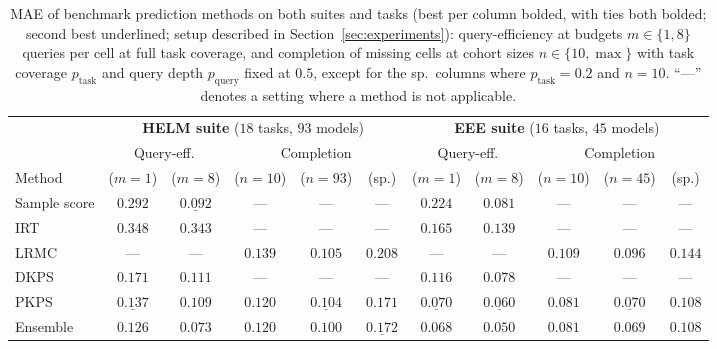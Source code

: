 \documentclass{article}
\theoremstyle{definition}
\theoremstyle{plain}
\newcommand{\PKPS}{PKPS\xspace}
\begin{document}
\begin{table}[t!]
\centering
\caption{MAE of benchmark prediction methods on both suites and tasks (best per column
bolded, with ties both bolded; second best underlined; setup described in
Section~\ref{sec:experiments}):
query-efficiency at budgets $m\in\{1,8\}$ queries per cell at full task coverage, and
completion of missing cells at cohort sizes $n\in\{10,\max\}$ with task coverage
$p_{\mathrm{task}}$ and query depth $p_{\mathrm{query}}$ fixed at $0.5$, except for the
sp.\ columns where $p_{\mathrm{task}}{=}0.2$ and $n{=}10$. ``---'' denotes a setting where a method is not
applicable.}
\label{tab:suite}
\footnotesize
\setlength{\tabcolsep}{3.4pt}\renewcommand{\arraystretch}{0.95}
\begin{tabular}{lccccc ccccc}
\toprule
 & \multicolumn{5}{c}{\textbf{HELM suite} ($18$ tasks, $93$ models)}
 & \multicolumn{5}{c}{\textbf{EEE suite} ($16$ tasks, $45$ models)} \\
\cmidrule(lr){2-6}\cmidrule(lr){7-11}
 & \multicolumn{2}{c}{Query-eff.} & \multicolumn{3}{c}{Completion}
 & \multicolumn{2}{c}{Query-eff.} & \multicolumn{3}{c}{Completion} \\
Method & ($m{=}1$) & ($m{=}8$) & ($n{=}10$) & ($n{=}93$) & (sp.)
       & ($m{=}1$) & ($m{=}8$) & ($n{=}10$) & ($n{=}45$) & (sp.) \\
\midrule
Sample score       & $0.292$ & $\underline{0.092}$ & --- & --- & --- & $0.224$ & $0.081$ & --- & --- & --- \\
IRT                & $0.348$ & $0.343$ & --- & --- & --- & $0.165$ & $0.139$ & --- & --- & --- \\
LRMC               & --- & --- & $0.139$ & $0.105$ & $0.208$ & --- & --- & $0.109$ & $0.096$ & $0.144$ \\
DKPS               & $0.171$ & $0.111$ & --- & --- & --- & $0.116$ & $0.078$ & --- & --- & --- \\
\PKPS              & $\underline{0.137}$ & $0.109$ & $\mathbf{0.120}$ & $\underline{0.104}$ & $\mathbf{0.171}$ & $\underline{0.070}$ & $\underline{0.060}$ & $\mathbf{0.081}$ & $\underline{0.070}$ & $\mathbf{0.108}$ \\
Ensemble           & $\mathbf{0.126}$ & $\mathbf{0.073}$ & $\mathbf{0.120}$ & $\mathbf{0.100}$ & $\underline{0.172}$ & $\mathbf{0.068}$ & $\mathbf{0.050}$ & $\mathbf{0.081}$ & $\mathbf{0.069}$ & $\mathbf{0.108}$ \\
\bottomrule
\end{tabular}
\end{table}
\end{document}
